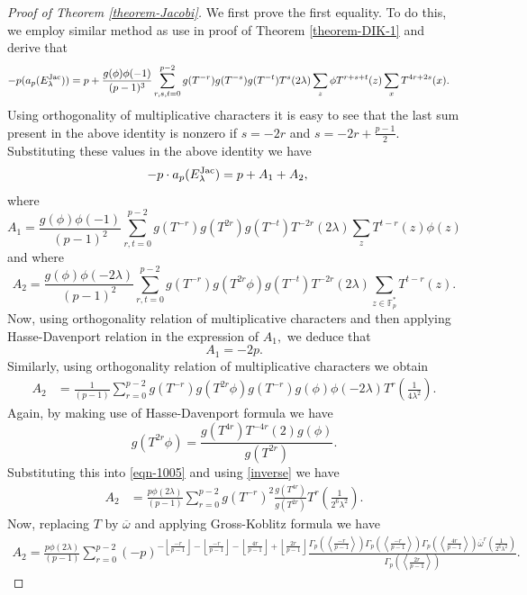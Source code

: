 \documentclass[12pt]{amsart}
\theoremstyle{plain}
\theoremstyle{definition}
\theoremstyle{remark}
\newcommand{\jac}{\text{{\rm{Jac}}}}
\numberwithin{equation}{section}
\begin{document}
\begin{proof}[Proof of Theorem \ref{theorem-Jacobi}] We first prove the first equality. To do this, we 
employ similar method as use in proof of Theorem \ref{theorem-DIK-1} and derive that
\begin{align}
 -p(a_p(E_\lambda^{\jac}))&=p+\frac{g(\phi)\phi(-1)}{(p-1)^3}\sum_{r,s,t=0}^{p-2}g(T^{-r})g(T^{-s})g(T^{-t})T^s(2\lambda)\sum_{z}\phi T^{r+s+t}(z)\sum_{x}T^{4r+2s}(x).\notag
\end{align}
Using orthogonality of multiplicative characters it is easy to see that the last sum present in the above identity is nonzero if  $s=-2r$ and $s=-2r+\frac{p-1}{2}.$ Substituting these values in the above identity we have 
\begin{align}\label{eqn-1004}
-p\cdot a_p(E^{\jac}_{\lambda})&=p+A_1+A_2,
\end{align}
\noindent where $$A_1=\frac{g(\phi)\phi(-1)}{(p-1)^2}\sum\limits_{r,t=0}^{p-2}g(T^{-r})g(T^{2r})g(T^{-t})T^{-2r}(2\lambda)\sum_{z}T^{t-r}(z)\phi(z)$$ and 
where $$A_2=\frac{g(\phi)\phi(-2\lambda)}{(p-1)^2}\sum_{r,t=0}^{p-2}g(T^{-r})g(T^{2r}\phi)g(T^{-t})T^{-2r}(2\lambda)\sum_{z\in \mathbb F_p^*}T^{t-r}(z).$$
Now, using orthogonality relation of multiplicative characters and then applying Hasse-Davenport relation in the expression of $A_1,$ we deduce that $$A_1=-2p.$$
\noindent Similarly, using orthogonality relation of multiplicative characters we obtain
\begin{align}\label{eqn-1005}
  A_2&=\frac{1}{(p-1)}\sum_{r=0}^{p-2}g(T^{-r})g(T^{2r}\phi)g(T^{-r})g(\phi)\phi(-2\lambda)T^{r}\left(\frac{1}{4\lambda^2}\right).
\end{align}
Again, by making use of Hasse-Davenport formula we have $$g(T^{2r}\phi)=\frac{g(T^{4r}){T}^{-4r}(2)g(\phi)}{g(T^{2r})}.$$
Substituting this into \eqref{eqn-1005} and using \eqref{inverse} we have 
\begin{align}\label{eqn-1006}
  A_2&=\frac{p\phi(2\lambda)}{(p-1)}\sum_{r=0}^{p-2}g(T^{-r})^2\frac{g(T^{4r})}{g(T^{2r})}T^{r}\left(\frac{1}{2^6\lambda^2}\right).
\end{align}
Now, replacing $T$ by $\overline{\omega}$ and applying Gross-Koblitz formula we have 
\begin{align}\label{eqn-1010}
A_2=\frac{p \phi(2\lambda)}{(p-1)}\sum_{r=0}^{p-2}(-p)^{-\left\lfloor\frac{-r}{p-1}\right\rfloor-\left\lfloor\frac{-r}{p-1}\right\rfloor-\left\lfloor\frac{4r}{p-1}\right\rfloor+\left\lfloor\frac{2r}{p-1}\right\rfloor}
\frac{ \Gamma_p\left(\left\langle\frac{-r}{p-1}\right\rangle\right) \Gamma_p\left(\left\langle\frac{-r}{p-1}\right\rangle\right)\Gamma_p\left(\left\langle\frac{4r}{p-1}\right\rangle\right)\overline{\omega}^{r}(\frac{1}{2^6\lambda^2})}{\Gamma_p\left(\left\langle\frac{2r}{p-1}\right\rangle\right)}.

\end{align}
\end{proof}
\end{document}
